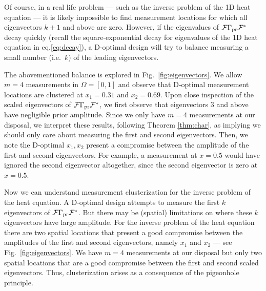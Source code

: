 Of course, in a real life problem --- such as the inverse problem of
the 1D heat equation --- it is likely impossible to find measurement
locations for which all eigenvectors $k+1$ and above are
zero. However, if the eigenvalues of $\mathcal{F}\Gamma_{\textup{pr}}\mathcal{F}^*$ decay quickly
(recall the square-exponential decay for eigenvalues of the 1D heat
equation in eq.\eqref{eq:decay}), a D-optimal design will try to
balance measuring a small number (i.e.~$k$) of the leading
eigenvectors.

The abovementioned balance is explored in
Fig.~\ref{fig:eigenvectors}. We allow $m=4$ measurements in $\Omega =
[0,1]$ and observe that D-optimal measurement locations are clustered
at $x_1 = 0.31$ and $x_2 = 0.69$. Upon close inspection of the scaled
eigenvectors of $\mathcal{F} \Gamma_{\textup{pr}} \mathcal{F}^*$, we first observe that
eigenvectors $3$ and above have negligible prior amplitude. Since we
only have $m=4$ measurements at our disposal, we interpret these
results, following Theorem \ref{thm:char}, as implying we should only
care about measuring the first and second eigenvectors. Then, we note
the D-optimal $x_1,x_2$ present a compromise between the amplitude of
the first and second eigenvectors. For example, a measurement at
$x=0.5$ would have ignored the second eigenvector altogether, since
the second eigenvector is zero at $x=0.5$.

Now we can understand measurement clusterization for the inverse
problem of the heat equation. A D-optimal design attempts to measure
the first $k$ eigenvectors of $\mathcal{F} \Gamma_{\textup{pr}} \mathcal{F}^*$. But there may be
(spatial) limitations on where these $k$ eigenvectors have large
amplitude. For the inverse problem of the heat equation there are two
spatial locations that present a good compromise between the
amplitudes of the first and second eigenvectors, namely $x_1$ and
$x_2$ --- see Fig.~\ref{fig:eigenvectors}. We have $m=4$ measurements
at our disposal but only two spatial locations that are a good
compromise between the first and second scaled eigenvectors. Thus,
clusterization arises as a consequence of the pigeonhole principle.

